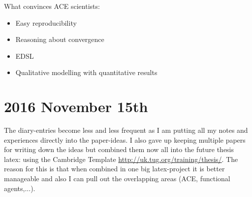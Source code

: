What convinces ACE scientists:
\begin{itemize}
\item Easy reproducibility
\item Reasoning about convergence
\item EDSL
\item Qualitative modelling with quantitative results
\end{itemize}

\section*{2016 November 15th}
The diary-entries become less and less frequent as I am putting all my notes and experiences directly into the paper-ideas. I also gave up keeping multiple papers for writing down the ideas but combined them now all into the future thesis latex: using the Cambridge Template \url{http://uk.tug.org/training/thesis/}. The reason for this is that when combined in one big latex-project it is better manageable and also I can pull out the overlapping areas (ACE, functional agents,...).
